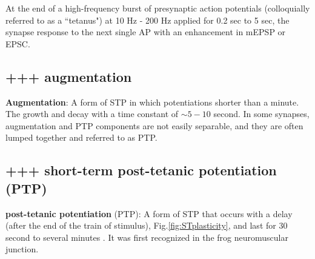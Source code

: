   At the end of a high-frequency burst of presynaptic action potentials
  (colloquially referred to as a ``tetanus") at 10 Hz - 200 Hz applied for 0.2 sec to 5 sec,
  the synapse response to the next single AP with an enhancement in mEPSP or
  EPSC. 

\subsection{+++ augmentation} 
\label{sec:STP-augmentation}
 
{\bf Augmentation}: A form of STP in which potentiations shorter than a
  minute. The growth and decay with a time constant of $\sim 5-10$ second.
  In some synapses, augmentation and PTP components are not easily separable,
 and they are often lumped together and referred to as PTP.

\subsection{+++ short-term post-tetanic potentiation (PTP)}
\label{sec:STP-PTP}

  {\bf post-tetanic potentiation} (PTP): A form of STP that
  occurs with a delay (after the end of the train of stimulus),
  Fig.\ref{fig:STplasticity}, and last for 30 second to several minutes
  \citep{huges1958}. It was first recognized in the frog neuromuscular
  junction.
    
